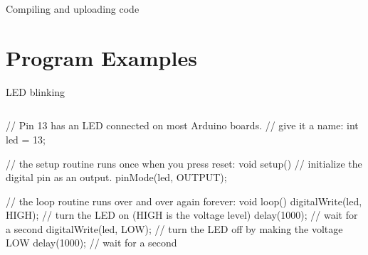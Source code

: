 \documentclass[compress]{beamer}
\begin{document}
{
    \begin{frame}{Compiling and uploading code}
    \end{frame}
}

\section{Program Examples}

\begin{frame}[fragile]{LED blinking}
    \begin{columns}
        \begin{column}{0.7\linewidth}
\begin{cppcode}
// Pin 13 has an LED connected on most Arduino boards.
// give it a name:
int led = 13;

// the setup routine runs once when you press reset:
void setup() {                
  // initialize the digital pin as an output.
  pinMode(led, OUTPUT);     
}

// the loop routine runs over and over again forever:
void loop() {
  digitalWrite(led, HIGH);   // turn the LED on (HIGH is the voltage level)
  delay(1000);               // wait for a second
  digitalWrite(led, LOW);    // turn the LED off by making the voltage LOW
  delay(1000);               // wait for a second
}
\end{cppcode}


\end{column}
\end{columns}
\end{frame}
\end{document}
